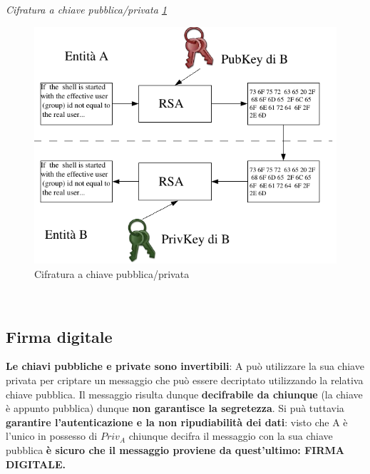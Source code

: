 \documentclass[12pt]{article}
\begin{document}
			\textit{Cifratura a chiave pubblica/privata \ref{fig:16}}\\
			\begin{figure}[h!]
				\centering
				\includegraphics[scale=0.60]{img/pubpriv.PNG}
				\caption{Cifratura a chiave pubblica/privata \label{fig:16}}
			\end{figure}\\
		
		\subsection{Firma digitale}
			\textbf{Le chiavi pubbliche e private sono invertibili}: A può utilizzare la sua chiave privata per criptare un messaggio che può essere decriptato utilizzando la relativa chiave pubblica. Il messaggio risulta dunque \textbf{decifrabile da chiunque} (la chiave è appunto pubblica) dunque \textbf{non garantisce la segretezza}. Si puà tuttavia \textbf{garantire l'autenticazione e la non ripudiabilità dei dati}: visto che A è l'unico in possesso di $Priv_{A}$ chiunque decifra il messaggio con la sua chiave pubblica \textbf{è sicuro che il messaggio proviene da quest'ultimo: FIRMA DIGITALE.}\\
			\newline
\end{document}
